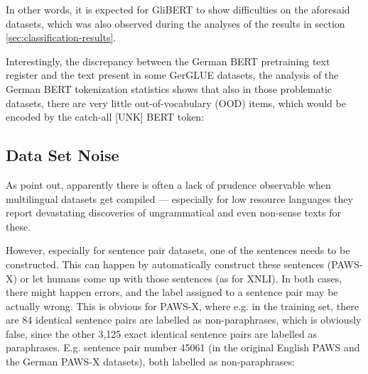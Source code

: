 In other words, it is expected for GliBERT to show difficulties on the aforesaid datasets, which
was also observed during the analyses of the results in section \ref{sec:classification-results}.

Interestingly, the discrepancy between the German BERT pretraining text register and the text
present in some GerGLUE datasets, the analysis of the German BERT tokenization statistics shows
that also in those problematic datasets, there are very little out-of-vocabulary (OOD) items, which
would be encoded by the catch-all [UNK] BERT token:




\subsection{Data Set Noise}
\label{sec:label-noise}

As \citep{caswell2021quality} point out, apparently there is often a lack of
prudence observable when multilingual datasets get compiled --- especially for
low resource languages they report devastating discoveries of ungrammatical
and even non-sense texts for these.


However, especially for sentence pair datasets, one of the sentences needs to be constructed. This
can happen by automatically construct these sentences (PAWS-X) or let humans come up with those
sentences (as for XNLI). In both cases, there might happen errors, and the label assigned to a
sentence pair may be actually wrong. This is obvious for PAWS-X, where e.g. in the training set,
there are 84 identical sentence pairs are labelled as non-paraphrases, which is obviously false,
since the other 3,125 exact identical sentence pairs are labelled as paraphrases. E.g. sentence pair
number 45061 (in the original English PAWS and the German PAWS-X datasets), both labelled as
non-paraphrases:

